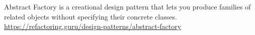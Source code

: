 \documentclass[a4paper]{article}
\title{}
\date{}
\begin{document}
    \maketitle
    Abstract Factory is a creational design pattern that lets you produce families of related objects without specifying their concrete classes. \url{https://refactoring.guru/design-patterns/abstract-factory}
\end{document}
